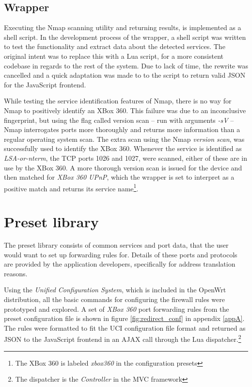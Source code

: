 \documentclass[a4paper,11pt,makeidx]{kth-bcs}
\begin{document}
\subsection{Wrapper}
Executing the Nmap scanning utility and returning results, is implemented as a shell script.
In the development process of the wrapper, a shell script was written to test the functionality and extract data about the detected services.
The original intent was to replace this with a Lua script, for a more consistent codebase in regards to the rest of the system.
Due to lack of time, the rewrite was cancelled and a quick adaptation was made to to the script to return valid JSON for the JavaScript frontend.

While testing the service identification features of Nmap, there is no way for Nmap to positively identify an XBox 360.
This failure was due to an inconclusive fingerprint, but using the flag called version scan -- run with arguments \emph{-sV} -- Nmap interrogates ports more thoroughly and returns more information than a regular operating system scan.
The extra scan using the Nmap \emph{version scan}, was successfully used to identify the XBox 360.
Whenever the service is identified as \emph{LSA-or-nterm}, the TCP ports 1026 and 1027, were scanned, either of these are in use by the XBox 360.\cite{aretheysecure}
A more thorough version scan is issued for the device and then matched for \emph{XBox 360 UPnP}, which the wrapper is set to interpret as a positive match and returns its service name\footnote{The XBox 360 is labeled \emph{xbox360} in the configuration presets}.

\section{Preset library}
The preset library consists of common services and port data, that the user would want to set up forwarding rules for.
Details of these ports and protocols are provided by the application developers, specifically for address translation reasons.

Using the \emph{Unified Configuration System}, which is included in the OpenWrt distribution, all the basic commands for configuring the firewall rules were prototyped and explored.
A set of \emph{XBox 360} port forwarding rules from the preset configuration file is shown in figure \ref{fig:redirect_conf} in appendix \ref{appA}.
The rules were formatted to fit the UCI configuration file format and returned as JSON to the JavaScript frontend in an AJAX call through the Lua dispatcher.\footnote{The dispatcher is the \emph{Controller} in the MVC framework}
\end{document}
